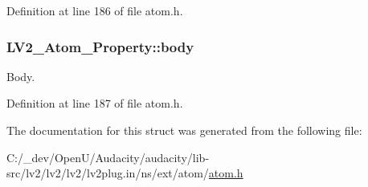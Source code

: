 Definition at line 186 of file atom.\+h.

\subsubsection[{\texorpdfstring{body}{body}}]{ L\+V2\+\_\+\+Atom\+\_\+\+Property\+::body}\hypertarget{struct_l_v2___atom___property_aada219d60860f04041f473ea21a8fdfd}{}\label{struct_l_v2___atom___property_aada219d60860f04041f473ea21a8fdfd}
Body. 

Definition at line 187 of file atom.\+h.



The documentation for this struct was generated from the following file\+:\begin{DoxyCompactItemize}
\item 
C\+:/\+\_\+dev/\+Open\+U/\+Audacity/audacity/lib-\/src/lv2/lv2/lv2/lv2plug.\+in/ns/ext/atom/\hyperlink{atom_8h}{atom.\+h}\end{DoxyCompactItemize}
